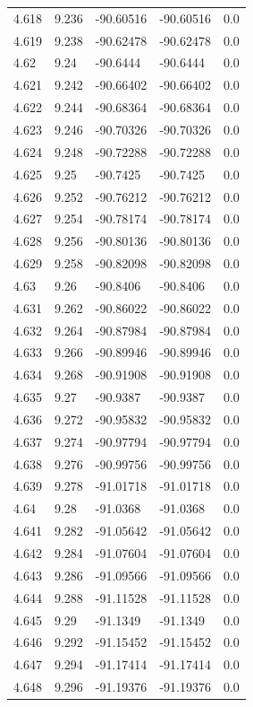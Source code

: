 \begin{tabular}{lllll}
4.618 & 9.236 & -90.60516 & -90.60516 & 0.0 \\
4.619 & 9.238 & -90.62478 & -90.62478 & 0.0 \\
4.62 & 9.24 & -90.6444 & -90.6444 & 0.0 \\
4.621 & 9.242 & -90.66402 & -90.66402 & 0.0 \\
4.622 & 9.244 & -90.68364 & -90.68364 & 0.0 \\
4.623 & 9.246 & -90.70326 & -90.70326 & 0.0 \\
4.624 & 9.248 & -90.72288 & -90.72288 & 0.0 \\
4.625 & 9.25 & -90.7425 & -90.7425 & 0.0 \\
4.626 & 9.252 & -90.76212 & -90.76212 & 0.0 \\
4.627 & 9.254 & -90.78174 & -90.78174 & 0.0 \\
4.628 & 9.256 & -90.80136 & -90.80136 & 0.0 \\
4.629 & 9.258 & -90.82098 & -90.82098 & 0.0 \\
4.63 & 9.26 & -90.8406 & -90.8406 & 0.0 \\
4.631 & 9.262 & -90.86022 & -90.86022 & 0.0 \\
4.632 & 9.264 & -90.87984 & -90.87984 & 0.0 \\
4.633 & 9.266 & -90.89946 & -90.89946 & 0.0 \\
4.634 & 9.268 & -90.91908 & -90.91908 & 0.0 \\
4.635 & 9.27 & -90.9387 & -90.9387 & 0.0 \\
4.636 & 9.272 & -90.95832 & -90.95832 & 0.0 \\
4.637 & 9.274 & -90.97794 & -90.97794 & 0.0 \\
4.638 & 9.276 & -90.99756 & -90.99756 & 0.0 \\
4.639 & 9.278 & -91.01718 & -91.01718 & 0.0 \\
4.64 & 9.28 & -91.0368 & -91.0368 & 0.0 \\
4.641 & 9.282 & -91.05642 & -91.05642 & 0.0 \\
4.642 & 9.284 & -91.07604 & -91.07604 & 0.0 \\
4.643 & 9.286 & -91.09566 & -91.09566 & 0.0 \\
4.644 & 9.288 & -91.11528 & -91.11528 & 0.0 \\
4.645 & 9.29 & -91.1349 & -91.1349 & 0.0 \\
4.646 & 9.292 & -91.15452 & -91.15452 & 0.0 \\
4.647 & 9.294 & -91.17414 & -91.17414 & 0.0 \\
4.648 & 9.296 & -91.19376 & -91.19376 & 0.0 \\

\end{tabular}
